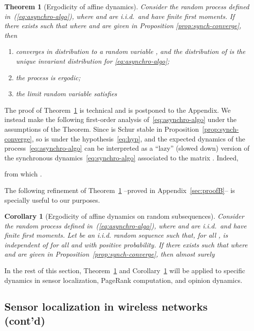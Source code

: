 \documentclass{IEEEtran}
\newtheorem{corollary}{Corollary}
\newtheorem{theorem}{Theorem}
\newcommand{\1}{\mathbf{1}} \newcommand{\ind}{\mathds{1}}
\begin{document}
\begin{theorem}[Ergodicity of affine dynamics]
\label{thm:ergodic}
Consider the random process  defined in~(\ref{eq:asynchro-algo}), where  and  are i.i.d.\ and have finite first moments. If there exists  such that 
 where  and  are given in Proposition \ref{prop:synch-converge}, then
\begin{enumerate}
\item  converges in distribution to a random variable , and the distribution of  is the unique invariant distribution for \eqref{eq:asynchro-algo};
\item the process is {\em ergodic};
\item the limit random variable satisfies
 
\end{enumerate}
\end{theorem}
The proof of Theorem~\ref{thm:ergodic} is technical and is postponed to the Appendix. We instead make the following first-order analysis of~\eqref{eq:asynchro-algo} under the assumptions of the Theorem.
Since  is Schur stable in Proposition~\ref{prop:synch-converge}, so is  under the hypothesis~\eqref{eq:hyp}, and the expected dynamics of the process~\eqref{eq:asynchro-algo} can be interpreted as a ``lazy'' (slowed down) version of the synchronous dynamics~\eqref{eq:synchro-algo} associated to the matrix . Indeed, 
 
from which
. 

The following refinement of Theorem~\ref{thm:ergodic} --proved in Appendix~\ref{sec:proofB}-- is specially useful to our purposes.
\begin{corollary}[Ergodicity of affine dynamics on random subsequences]
\label{cor:ergodic2}
Consider the random process  defined in~(\ref{eq:asynchro-algo}), where  and  are i.i.d.\ and have finite first moments. 
Let  be an i.i.d. random sequence such that, for all ,  is independent of  for all  and   with positive probability.
If there exists  such that 
 where  and  are given in Proposition~\ref{prop:synch-converge}, then almost surely

\end{corollary}

In the rest of this section, Theorem~\ref{thm:ergodic} and Corollary~\ref{cor:ergodic2} will be applied to specific dynamics in sensor localization, PageRank computation, and opinion dynamics. 


\subsection{Sensor localization in wireless networks (cont'd)}\label{sect:random-localization}
\end{document}
